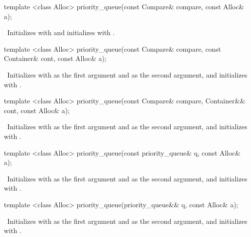 \begin{itemdecl}
template <class Alloc> priority_queue(const Compare& compare, const Alloc& a);
\end{itemdecl}

\begin{itemdescr}
\pnum
\effects\ Initializes  with  and initializes  with .
\end{itemdescr}

\begin{itemdecl}
template <class Alloc>
  priority_queue(const Compare& compare, const Container& cont, const Alloc& a);
\end{itemdecl}

\begin{itemdescr}
\pnum
\effects\ Initializes  with  as the first argument and  as the second
argument, and initializes  with .
\end{itemdescr}

\begin{itemdecl}
template <class Alloc>
  priority_queue(const Compare& compare, Container&& cont, const Alloc& a);
\end{itemdecl}

\begin{itemdescr}
\pnum
\effects\ Initializes  with  as the first argument and 
as the second argument, and initializes  with .
\end{itemdescr}

\begin{itemdecl}
template <class Alloc> priority_queue(const priority_queue& q, const Alloc& a);
\end{itemdecl}

\begin{itemdescr}
\pnum
\effects\ Initializes  with  as the first argument and  as
the second argument, and initializes  with .
\end{itemdescr}

\begin{itemdecl}
template <class Alloc> priority_queue(priority_queue&& q, const Alloc& a);
\end{itemdecl}

\begin{itemdescr}
\pnum
\effects\ Initializes  with  as the first argument and 
as the second argument, and initializes  with .
\end{itemdescr}

